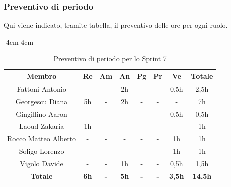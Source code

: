 \documentclass[a4paper,12pt]{article}
\begin{document}
\subsubsection{Preventivo di periodo}
Qui viene indicato, tramite tabella, il preventivo delle ore per ogni ruolo.
\begin{table}[H]
    \begin{adjustwidth}{-4cm}{-4cm}
    \centering
    \begin{tabular}{|c|c|c|c|c|c|c|c|}
        \hline
        \textbf{Membro} & \textbf{Re} & \textbf{Am} & \textbf{An} & \textbf{Pg} & \textbf{Pr} & \textbf{Ve} & \textbf{Totale} \\
        \hline
        Fattoni Antonio      & -    & - & 2h  & - & - & 0,5h      & 2,5h \\
        \hline
        Georgescu Diana      & 5h   & - & 2h & - & - & -      & 7h \\
        \hline
        Gingillino Aaron     & -    & - & -  & - & - & 0,5h   & 0,5h \\
        \hline
        Laoud Zakaria        & 1h   & - & -  & - & - & -      & 1h \\
        \hline
        Rocco Matteo Alberto & -    & - & -  & - & - & 1h  & 1h \\
        \hline
        Soligo Lorenzo       & -    & - & -  & - & - & 1h  & 1h \\
        \hline
        Vigolo Davide        & -    & - & 1h  & - & - & 0,5h & 1,5h \\
        \hline
        \textbf{Totale} & \textbf{6h} & \textbf{-} & \textbf{5h} & \textbf{-} & \textbf{-} & \textbf{3,5h} & \textbf{14,5h} \\
        \hline
    \end{tabular}
    \caption{Preventivo di periodo per lo Sprint 7}
    \end{adjustwidth}
\end{table}
\end{document}

